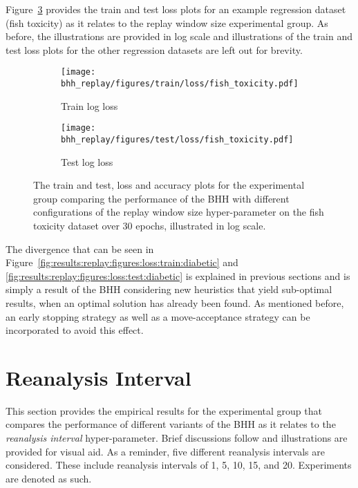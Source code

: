 Figure~\ref{fig:results:replay:figures:fish_toxicity} provides the train and test loss plots for an example regression dataset (fish toxicity) as it relates to the replay window size experimental group. As before, the illustrations are provided in log scale and illustrations of the train and test loss plots for the other regression datasets are left out for brevity.

\begin{figure}[htbp]
      \begin{subfigure}{0.5\textwidth}
            \centering
            \texttt{[image: bhh\_replay/figures/train/loss/fish\_toxicity.pdf]}
            \caption{Train log loss}
            \label{fig:results:replay:figures:loss:train:fish_toxicity}
      \end{subfigure}
      \begin{subfigure}{0.5\textwidth}
            \centering
            \texttt{[image: bhh\_replay/figures/test/loss/fish\_toxicity.pdf]}
            \caption{Test log loss}
            \label{fig:results:replay:figures:loss:test:fish_toxicity}
      \end{subfigure}
      \par\bigskip
      \caption{The train and test, loss and accuracy plots for the experimental group comparing the performance of the \acs{BHH} with different configurations of the replay window size hyper-parameter on the fish toxicity dataset over 30 epochs, illustrated in log scale.}
      \label{fig:results:replay:figures:fish_toxicity}
\end{figure}

The divergence that can be seen in Figure~\ref{fig:results:replay:figures:loss:train:diabetic} and \ref{fig:results:replay:figures:loss:test:diabetic} is explained in previous sections and is simply a result of the \acs{BHH} considering new heuristics that yield sub-optimal results, when an optimal solution has already been found. As mentioned before, an early stopping strategy as well as a move-acceptance strategy can be incorporated to avoid this effect.



\section{Reanalysis Interval}\label{sec:results:reanalysis}

This section provides the empirical results for the experimental group that compares the performance of different variants of the \acs{BHH} as it relates to the \textit{reanalysis interval} hyper-parameter. Brief discussions follow and illustrations are provided for visual aid. As a reminder, five different reanalysis intervals are considered. These include reanalysis intervals of 1, 5, 10, 15, and 20. Experiments are denoted as such.

